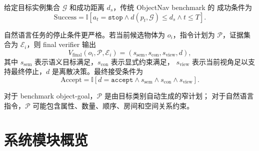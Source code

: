 \documentclass[UTF8,zihao=-4]{ctexart}
\begin{document}
给定目标实例集合 $\mathcal{G}$ 和成功距离 $d_s$，传统 ObjectNav benchmark 的
成功条件为
\begin{equation}
  \mathrm{Success}
  =
  \mathbb{I}
  \left[
    a_t = \texttt{stop}
    \land
    d(p_t,\mathcal{G}) \le d_s
    \land
    t \le T
  \right].
  \label{eq:benchmark_success}
\end{equation}

自然语言任务的停止条件更严格。若当前候选物体为 $o_i$，指令计划为
$\mathcal{P}$，证据集合为 $\mathcal{E}_i$，则 final verifier 输出
\begin{equation}
  V_{\mathrm{final}}(o_i,\mathcal{P},\mathcal{E}_i)
  =
  (s_{\mathrm{sem}}, s_{\mathrm{con}}, s_{\mathrm{view}}, d),
\end{equation}
其中 $s_{\mathrm{sem}}$ 表示语义目标满足，$s_{\mathrm{con}}$ 表示显式约束满足，
$s_{\mathrm{view}}$ 表示当前视角足以支持最终停止，$d$ 是离散决策。最终接受条件为
\begin{equation}
  \mathrm{Accept}
  =
  \mathbb{I}
  \left[
    d=\texttt{accept}
    \land s_{\mathrm{sem}}
    \land s_{\mathrm{con}}
    \land s_{\mathrm{view}}
  \right].
  \label{eq:final_accept}
\end{equation}

对于 benchmark object-goal，$\mathcal{P}$ 是由目标类别自动生成的窄计划；
对于自然语言指令，$\mathcal{P}$ 可能包含属性、数量、顺序、房间和空间关系约束。

\section{系统模块概览}
\end{document}
